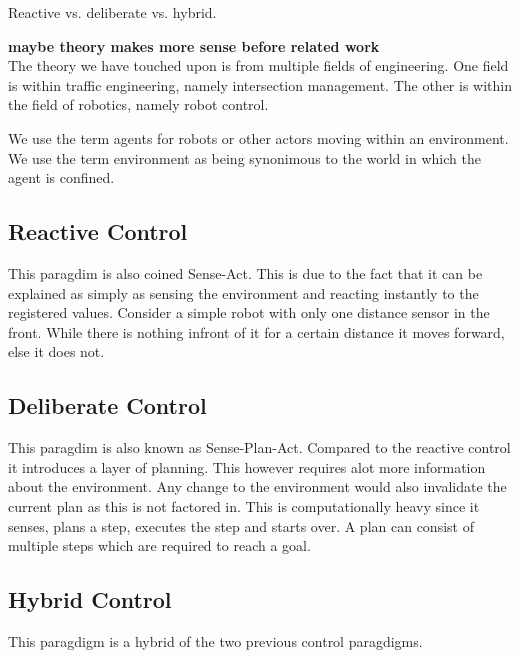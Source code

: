 Reactive vs. deliberate vs. hybrid.

\textbf{maybe theory makes more sense before related work}\\

The theory we have touched upon is from multiple fields of engineering. One field is within traffic engineering, namely intersection management. The other is within the field of robotics, namely robot control.

We use the term agents for robots or other actors moving within an environment. We use the term environment as being synonimous to the world in which the agent is confined.

\subsection{Reactive Control}
This paragdim is also coined Sense-Act. This is due to the fact that it can be explained as simply as sensing the environment and reacting instantly to the registered values.
Consider a simple robot with only one distance sensor in the front. While there is nothing infront of it for a certain distance it moves forward, else it does not.

\subsection{Deliberate Control}
This paragdim is also known as Sense-Plan-Act. Compared to the reactive control it introduces a layer of planning. This however requires alot more information about the environment. Any change to the environment would also invalidate the current plan as this is not factored in. This is computationally heavy since it senses, plans a step, executes the step and starts over.
A plan can consist of multiple steps which are required to reach a goal.

\subsection{Hybrid Control}
This paragdigm is a hybrid of the two previous control paragdigms. 
